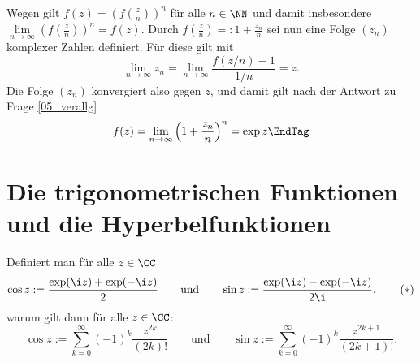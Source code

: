 \begin{antwort}
  Wegen  gilt $f(z)=\left(f\left(\frac{z}{n}\right)\right)^n$ für alle $n\in\NN$ 
  und damit insbesondere 
  $\lim\limits_{n\to\infty}\left(f\left(\frac{z}{n}\right)\right)^n = f(z)$. 
  Durch $f\left( \frac{z}{n} \right) =: 1+\frac{z_n}{n}$ 
  sei nun eine Folge $(z_n)$ komplexer Zahlen definiert. 
  Für diese gilt mit  
  \[
  \lim_{n\to\infty} z_n 
  = \lim_{n\to\infty} \frac{f(z/n)-1}{1/n} = z. 
  \]
  Die Folge $(z_n)$ konvergiert also gegen $z$, und damit gilt 
  nach der Antwort zu Frage \ref{05_verallg}
  \begin{equation}
    f(z)=\lim_{n\to\infty} \left(1+\frac{z_n}{n} \right)^n = \exp z
    \EndTag
  \end{equation} 
\end{antwort}


\section{Die trigonometrischen Funktionen und die Hyperbelfunktionen}
\label{sincos}



\begin{frage}\label{05_sinus}
  Definiert man für alle $z\in\CC$
  \begin{equation}
    \cos z := \frac{\exp(\i z) + \exp(-\i z)}{2} \qquad\text{und}\qquad
    \sin z := \frac{\exp(\i z) - \exp(-\i z)}{2\i}, \tag{$\ast$}
  \end{equation}
  warum gilt dann für alle $z\in\CC$:
  \begin{equation}
    \cos z := \sum_{k=0}^\infty (-1)^k \frac{z^{2k}}{(2k)!}
    \qquad\text{und}\qquad
    \sin z := \sum_{k=0}^\infty (-1)^k \frac{z^{2k+1}}{(2k+1)!}.
    \tag{$\ast\ast$}
  \end{equation}
\end{frage}

